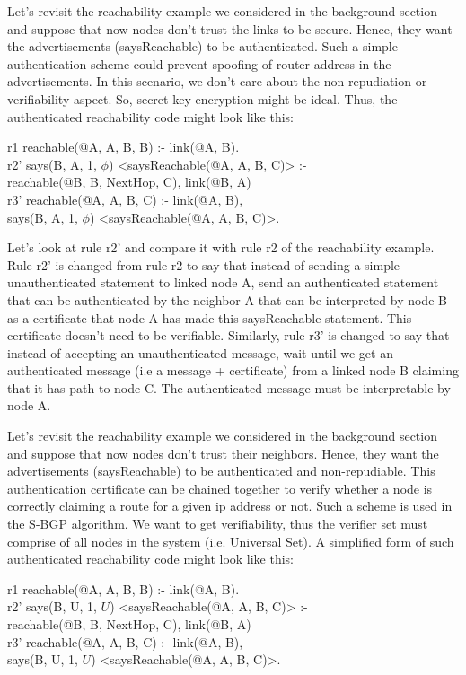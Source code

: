 Let's revisit the reachability example we considered in the background section and suppose that now nodes don't trust the links to be secure. Hence, they want the advertisements (saysReachable) to be authenticated. Such a simple authentication scheme could prevent spoofing of router address in the advertisements. In this scenario, we don't care about the non-repudiation or verifiability aspect. So, secret key encryption might be ideal. Thus, the authenticated reachability code might look like this:
\begin{code}
r1 reachable(@A, A, B, B) :- link(@A, B).\\
r2' says(B, A, 1, $\phi$) <saysReachable(@A, A, B, C)> :- \\
\> reachable(@B, B, NextHop, C), link(@B, A)\\
r3' reachable(@A, A, B, C) :- link(@A, B), \\
\> says(B, A, 1, $\phi$) <saysReachable(@A, A, B, C)>.
\end{code}

Let's look at rule r2' and compare it with rule r2 of the reachability example. Rule r2' is changed from rule r2 to say that instead of sending a simple unauthenticated statement to linked node A, send an authenticated statement that can be authenticated by the neighbor A that can be interpreted by node B as a certificate that node A has made this saysReachable statement. This certificate doesn't need to be verifiable. Similarly, rule r3' is changed to say that instead of accepting an unauthenticated message, wait until we get an authenticated message (i.e a message + certificate) from a linked node B claiming that it has path to node C. The authenticated message must be interpretable by node A.

Let's revisit the reachability example we considered in the background section and suppose that now nodes don't trust their neighbors. Hence, they want the advertisements (saysReachable) to be authenticated and non-repudiable. This authentication certificate can be chained together to verify whether a node is correctly claiming a route for a given ip address or not. Such a scheme is used in the S-BGP algorithm. We want to get verifiability, thus the verifier set must comprise of all nodes in the system (i.e. Universal Set). A simplified form of such authenticated reachability code might look like this:
\begin{code}
r1 reachable(@A, A, B, B) :- link(@A, B).\\
r2' says(B, U, 1, $U$) <saysReachable(@A, A, B, C)> :- \\
\> reachable(@B, B, NextHop, C), link(@B, A)\\
r3' reachable(@A, A, B, C) :- link(@A, B), \\
\> says(B, U, 1, $U$) <saysReachable(@A, A, B, C)>.
\end{code}

